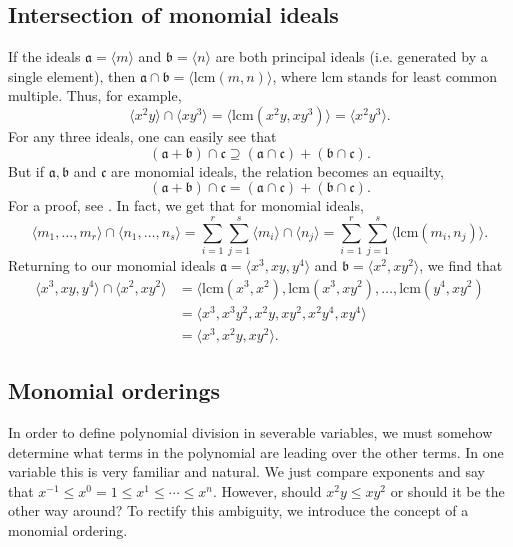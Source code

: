 \documentclass[english,bachelor]{liumaiex}
\begin{document}
\subsection{Intersection of monomial ideals}
If the ideals $\mathfrak{a}=\langle m \rangle$ and $\mathfrak{b}=\langle n \rangle$ are both principal ideals (i.e. generated by a single element), then $\mathfrak{a}\cap\mathfrak{b}=\langle \textrm{lcm}(m,n)\rangle$, where lcm stands for least common multiple. Thus, for example,
\begin{displaymath}
\langle x^2y\rangle\cap\langle xy^3 \rangle = \langle \textrm{lcm}(x^2y,xy^3) \rangle = \langle x^2y^3\rangle.
\end{displaymath}
For any three ideals, one can easily see that
\begin{displaymath}
(\mathfrak{a}+\mathfrak{b})\cap\mathfrak{c}\supseteq(\mathfrak{a}\cap\mathfrak{c})+(\mathfrak{b}\cap\mathfrak{c}).
\end{displaymath}
But if $\mathfrak{a},\mathfrak{b}$ and $\mathfrak{c}$ are monomial ideals, the relation becomes an equailty,
\begin{displaymath}
(\mathfrak{a}+\mathfrak{b})\cap\mathfrak{c}=(\mathfrak{a}\cap\mathfrak{c})+(\mathfrak{b}\cap\mathfrak{c}).
\end{displaymath}
For a proof, see \cite[p. 39]{froberg}. In fact, we get that for monomial ideals,
\begin{displaymath}
\langle m_1,\dots,m_r\rangle\cap\langle n_1,\dots,n_s\rangle = \sum_{i=1}^{r}\sum_{j=1}^{s}\langle m_i \rangle \cap \langle n_j \rangle = \sum_{i=1}^{r}\sum_{j=1}^{s}\langle \textrm{lcm}(m_i,n_j)\rangle.
\end{displaymath}
Returning to our monomial ideals $\mathfrak{a}=\langle x^3,xy,y^4\rangle$ and $\mathfrak{b}=\langle x^2,xy^2\rangle$, we find that
\begin{align*}
\langle x^3,xy,y^4\rangle\cap\langle x^2,xy^2\rangle &= \langle \textrm{lcm}(x^3,x^2),\textrm{lcm}(x^3,xy^2),\dots,\textrm{lcm}(y^4,xy^2)\\
&=\langle x^3,x^3y^2,x^2y,xy^2,x^2y^4,xy^4\rangle \\ 
&= \langle x^3,x^2y,xy^2\rangle.
\end{align*}

\subsection{Monomial orderings}
In order to define polynomial division in severable variables, we must somehow determine what terms in the polynomial are leading over the other terms. In one variable this is very familiar and natural. We just compare exponents and say that $x^{-1}\leq x^0=1 \leq x^1 \leq \cdots \leq x^n$. However, should $x^2y \leq xy^2$ or should it be the other way around? To rectify this ambiguity, we  introduce the concept of a monomial ordering.
\end{document}
